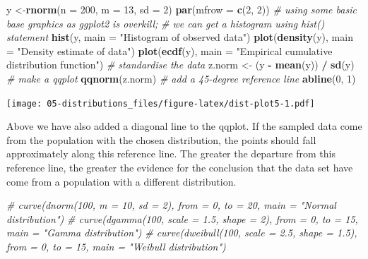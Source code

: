 \documentclass[english,10pt,a4paper,oneside]{book}
\newenvironment{Shaded}{\begin{snugshade}}{\end{snugshade}}
\newcommand{\CommentTok}[1]{\textcolor[rgb]{0.56,0.35,0.01}{\textit{#1}}}
\newcommand{\DataTypeTok}[1]{\textcolor[rgb]{0.13,0.29,0.53}{#1}}
\newcommand{\DecValTok}[1]{\textcolor[rgb]{0.00,0.00,0.81}{#1}}
\newcommand{\KeywordTok}[1]{\textcolor[rgb]{0.13,0.29,0.53}{\textbf{#1}}}
\newcommand{\NormalTok}[1]{#1}
\newcommand{\OperatorTok}[1]{\textcolor[rgb]{0.81,0.36,0.00}{\textbf{#1}}}
\newcommand{\StringTok}[1]{\textcolor[rgb]{0.31,0.60,0.02}{#1}}
\theoremstyle{definition}
\theoremstyle{definition}
\theoremstyle{definition}
\theoremstyle{remark}
\begin{document}
\begin{Shaded}
\begin{Highlighting}[]
\NormalTok{y <-}\KeywordTok{rnorm}\NormalTok{(}\DataTypeTok{n =} \DecValTok{200}\NormalTok{, }\DataTypeTok{m =} \DecValTok{13}\NormalTok{, }\DataTypeTok{sd =} \DecValTok{2}\NormalTok{)}
\KeywordTok{par}\NormalTok{(}\DataTypeTok{mfrow =} \KeywordTok{c}\NormalTok{(}\DecValTok{2}\NormalTok{, }\DecValTok{2}\NormalTok{))}
\CommentTok{# using some basic base graphics as ggplot2 is overkill;}
\CommentTok{# we can get a histogram using hist() statement}
\KeywordTok{hist}\NormalTok{(y, }\DataTypeTok{main =} \StringTok{"Histogram of observed data"}\NormalTok{)}
\KeywordTok{plot}\NormalTok{(}\KeywordTok{density}\NormalTok{(y), }\DataTypeTok{main =} \StringTok{"Density estimate of data"}\NormalTok{)}
\KeywordTok{plot}\NormalTok{(}\KeywordTok{ecdf}\NormalTok{(y), }\DataTypeTok{main =} \StringTok{"Empirical cumulative distribution function"}\NormalTok{)}
\CommentTok{# standardise the data}
\NormalTok{z.norm <-}\StringTok{ }\NormalTok{(y }\OperatorTok{-}\StringTok{ }\KeywordTok{mean}\NormalTok{(y)) }\OperatorTok{/}\StringTok{ }\KeywordTok{sd}\NormalTok{(y) }
\CommentTok{# make a qqplot}
\KeywordTok{qqnorm}\NormalTok{(z.norm)}
\CommentTok{# add a 45-degree reference line}
\KeywordTok{abline}\NormalTok{(}\DecValTok{0}\NormalTok{, }\DecValTok{1}\NormalTok{)}
\end{Highlighting}
\end{Shaded}

\texttt{[image: 05-distributions\_files/figure-latex/dist-plot5-1.pdf]}

Above we have also added a diagonal line to the qqplot. If the sampled
data come from the population with the chosen distribution, the points
should fall approximately along this reference line. The greater the
departure from this reference line, the greater the evidence for the
conclusion that the data set have come from a population with a
different distribution.

\begin{Shaded}
\begin{Highlighting}[]
\CommentTok{# curve(dnorm(100, m = 10, sd = 2), from = 0, to = 20, main = "Normal distribution")}
\CommentTok{# curve(dgamma(100, scale = 1.5, shape = 2), from = 0, to = 15, main = "Gamma distribution")}
\CommentTok{# curve(dweibull(100, scale = 2.5, shape = 1.5), from = 0, to = 15, main = "Weibull distribution")}
\end{Highlighting}
\end{Shaded}
\end{document}
